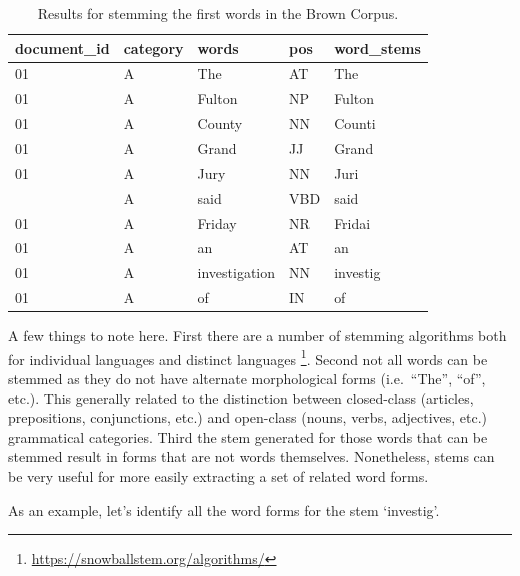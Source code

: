 \documentclass[
]{article}
\begin{document}
\begin{table}

\caption{\label{tab:recoding-stemming-brown-example}Results for stemming the first words in the Brown Corpus.}
\centering
\begin{tabular}[t]{lllll}
\toprule
document\_id & category & words & pos & word\_stems\\
\midrule
01 & A & The & AT & The\\
01 & A & Fulton & NP & Fulton\\
01 & A & County & NN & Counti\\
01 & A & Grand & JJ & Grand\\
01 & A & Jury & NN & Juri\\
\addlinespace
01 & A & said & VBD & said\\
01 & A & Friday & NR & Fridai\\
01 & A & an & AT & an\\
01 & A & investigation & NN & investig\\
01 & A & of & IN & of\\
\bottomrule
\end{tabular}
\end{table}

A few things to note here. First there are a number of stemming algorithms both for individual languages and distinct languages \footnote{\url{https://snowballstem.org/algorithms/}}. Second not all words can be stemmed as they do not have alternate morphological forms (i.e.~``The'', ``of'', etc.). This generally related to the distinction between closed-class (articles, prepositions, conjunctions, etc.) and open-class (nouns, verbs, adjectives, etc.) grammatical categories. Third the stem generated for those words that can be stemmed result in forms that are not words themselves. Nonetheless, stems can be very useful for more easily extracting a set of related word forms.

As an example, let's identify all the word forms for the stem `investig'.
\end{document}
